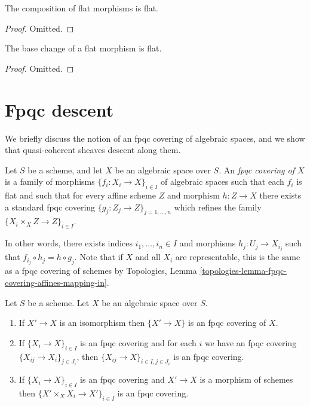 \begin{lemma}
\label{lemma-composition-flat}
The composition of flat morphisms is flat.
\end{lemma}

\begin{proof}
Omitted.
\end{proof}

\begin{lemma}
\label{lemma-base-change-flat}
The base change of a flat morphism is flat.
\end{lemma}

\begin{proof}
Omitted.
\end{proof}







\section{Fpqc descent}
\label{section-fpqc-descent}

\noindent
We briefly discuss the notion of an fpqc covering of algebraic spaces,
and we show that quasi-coherent sheaves descent along them.

\begin{definition}
\label{definition-fpqc-covering}
Let $S$ be a scheme, and let $X$ be an algebraic space over $S$.
An {\it fpqc covering of $X$} is a family of morphisms
$\{f_i : X_i \to X\}_{i \in I}$ of algebraic spaces
such that each $f_i$ is flat and such that for every affine scheme
$Z$ and morphism $h : Z \to X$ there exists a standard fpqc covering
$\{g_j : Z_j \to Z\}_{j = 1, \ldots, n}$ which refines the family
$\{X_i \times_X Z \to Z\}_{i \in I}$.
\end{definition}

\noindent
In other words, there exists indices $i_1, \ldots, i_n \in I$ and
morphisms $h_j : U_j \to X_{i_j}$ such that
$f_{i_j} \circ h_j = h \circ g_j$. Note that if $X$ and all $X_i$ are
representable, this is the same as a fpqc covering of schemes by
Topologies, Lemma \ref{topologies-lemma-fpqc-covering-affines-mapping-in}.

\begin{lemma}
\label{lemma-fpqc}
Let $S$ be a scheme.
Let $X$ be an algebraic space over $S$.
\begin{enumerate}
\item If $X' \to X$ is an isomorphism then $\{X' \to X\}$
is an fpqc covering of $X$.
\item If $\{X_i \to X\}_{i\in I}$ is an fpqc covering and for each
$i$ we have an fpqc covering $\{X_{ij} \to X_i\}_{j\in J_i}$, then
$\{X_{ij} \to X\}_{i \in I, j\in J_i}$ is an fpqc covering.
\item If $\{X_i \to X\}_{i\in I}$ is an fpqc covering
and $X' \to X$ is a morphism of schemes then
$\{X' \times_X X_i \to X'\}_{i\in I}$ is an fpqc covering.
\end{enumerate}
\end{lemma}

